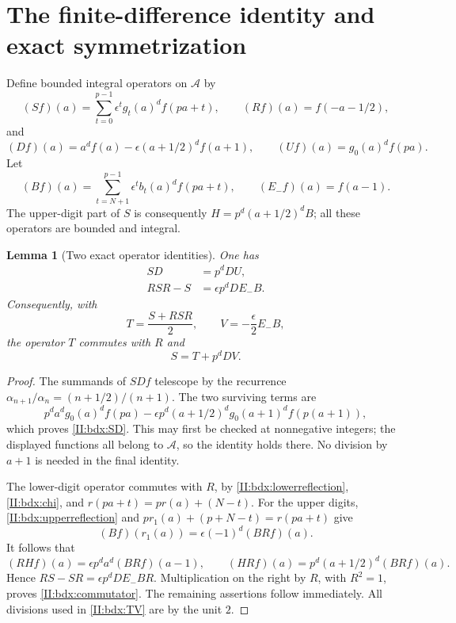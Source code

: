 \documentclass[11pt,letterpaper]{article}
\newtheorem{lemma}[theorem]{Lemma}
\theoremstyle{definition}
\theoremstyle{remark}
\begin{document}
\section{The finite-difference identity and exact symmetrization}

Define bounded integral operators on $\mathcal A$ by
\[
 (Sf)(a)=\sum_{t=0}^{p-1}\epsilon^t g_t(a)^d f(pa+t),
 \qquad (Rf)(a)=f(-a-1/2),
\]
and
\begin{equation}\label{II:bdx:D}
 (Df)(a)=a^d f(a)-\epsilon(a+1/2)^d f(a+1),
 \qquad (Uf)(a)=g_0(a)^d f(pa).
\end{equation}
Let
\[
 (Bf)(a)=\sum_{t=N+1}^{p-1}\epsilon^t b_t(a)^d f(pa+t),
 \qquad (E_-f)(a)=f(a-1).
\]
The upper-digit part of $S$ is consequently
$H=p^d(a+1/2)^dB$; all these operators are bounded and integral.

\begin{lemma}[Two exact operator identities]\label{II:bdx:identities}
One has
\begin{align}
 SD&=p^dDU,\label{II:bdx:SD}\\
 RSR-S&=\epsilon p^dDE_-B.\label{II:bdx:commutator}
\end{align}
Consequently, with
\begin{equation}\label{II:bdx:TV}
 T=\frac{S+RSR}{2},\qquad V=-\frac\epsilon2 E_-B,
\end{equation}
the operator $T$ commutes with $R$ and
\begin{equation}\label{II:bdx:split}
 S=T+p^dDV.
\end{equation}
\end{lemma}
\begin{proof}
The summands of $SDf$ telescope by the recurrence
$\alpha_{n+1}/\alpha_n=(n+1/2)/(n+1)$. The two surviving terms are
\[
 p^d a^d g_0(a)^d f(pa)
 -\epsilon p^d(a+1/2)^d g_0(a+1)^d f(p(a+1)),
\]
which proves \eqref{II:bdx:SD}. This may first be checked at nonnegative
integers; the displayed functions all belong to $\mathcal A$, so the
identity holds there. No division by $a+1$ is needed in the final
identity.

The lower-digit operator commutes with $R$, by
\eqref{II:bdx:lowerreflection}, \eqref{II:bdx:chi}, and
$r(pa+t)=pr(a)+(N-t)$.
For the upper digits, \eqref{II:bdx:upperreflection} and
$pr_1(a)+(p+N-t)=r(pa+t)$ give
\[
 (Bf)(r_1(a))=\epsilon(-1)^d(BRf)(a).
\]
It follows that
\[
 (RHf)(a)=\epsilon p^d a^d(BRf)(a-1),
 \qquad (HRf)(a)=p^d(a+1/2)^d(BRf)(a).
\]
Hence $RS-SR=\epsilon p^dDE_-BR$.
Multiplication on the right by $R$, with $R^2=1$, proves
\eqref{II:bdx:commutator}. The remaining assertions follow immediately.
All divisions used in \eqref{II:bdx:TV} are by the unit $2$.
\end{proof}
\end{document}
